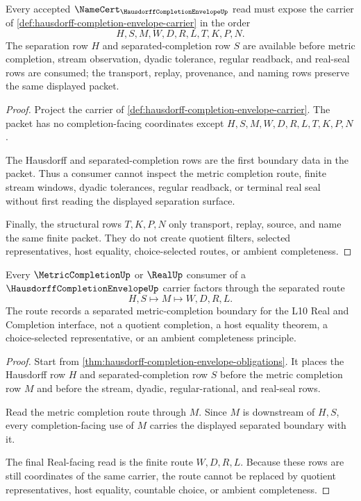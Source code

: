 \begin{theorem}
\label{thm:hausdorff-completion-envelope-obligations}
Every accepted $\NameCert_{\HausdorffCompletionEnvelopeUp}$ read must expose the carrier of \autoref{def:hausdorff-completion-envelope-carrier} in the order
$$
H,S,M,W,D,R,L,T,K,P,N .
$$
The separation row $H$ and separated-completion row $S$ are available before metric completion, stream observation, dyadic tolerance, regular readback, and real-seal rows are consumed; the transport, replay, provenance, and naming rows preserve the same displayed packet.
\end{theorem}
\begin{proof}
Project the carrier of \autoref{def:hausdorff-completion-envelope-carrier}. The packet has no completion-facing coordinates except $H,S,M,W,D,R,L,T,K,P,N$.

The Hausdorff and separated-completion rows are the first boundary data in the packet. Thus a consumer cannot inspect the metric completion route, finite stream windows, dyadic tolerances, regular readback, or terminal real seal without first reading the displayed separation surface.

Finally, the structural rows $T,K,P,N$ only transport, replay, source, and name the same finite packet. They do not create quotient filters, selected representatives, host equality, choice-selected routes, or ambient completeness.
\end{proof}

\begin{theorem}
\label{thm:hausdorff-completion-envelope-separated-metric-route}
Every $\MetricCompletionUp$ or $\RealUp$ consumer of a $\HausdorffCompletionEnvelopeUp$ carrier factors through the separated route
$$
H,S \longmapsto M \longmapsto W,D,R,L .
$$
The route records a separated metric-completion boundary for the L10 Real and Completion interface, not a quotient completion, a host equality theorem, a choice-selected representative, or an ambient completeness principle.
\end{theorem}
\begin{proof}
Start from \autoref{thm:hausdorff-completion-envelope-obligations}. It places the Hausdorff row $H$ and separated-completion row $S$ before the metric completion row $M$ and before the stream, dyadic, regular-rational, and real-seal rows.

Read the metric completion route through $M$. Since $M$ is downstream of $H,S$, every completion-facing use of $M$ carries the displayed separated boundary with it.

The final Real-facing read is the finite route $W,D,R,L$. Because these rows are still coordinates of the same carrier, the route cannot be replaced by quotient representatives, host equality, countable choice, or ambient completeness.
\end{proof}

